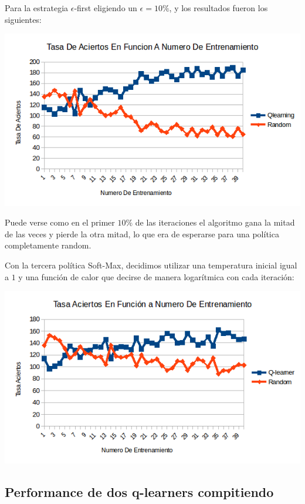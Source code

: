 
Para la estrategia $\epsilon$-first eligiendo un $\epsilon=10\%$, y los resultados fueron los siguientes:

\includegraphics[scale=0.5]{testing/ef.png}

Puede verse como en el primer $10\%$ de las iteraciones el algoritmo gana la mitad de las veces y pierde la otra mitad, lo que era de esperarse para una política completamente random.

Con la tercera política Soft-Max, decidimos utilizar una temperatura inicial igual a $1$ y una función de calor que decirse de manera logarítmica con cada iteración:

\includegraphics[scale=0.5]{testing/softmax.png}


\subsection{Performance de dos q-learners compitiendo}

